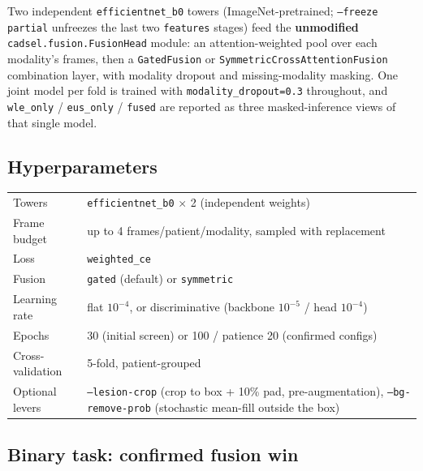 \documentclass[10pt]{article}
\begin{document}
\begin{sloppypar}
Two independent \texttt{efficientnet\_b0} towers (ImageNet-pretrained; \texttt{--freeze partial} unfreezes
the last two \texttt{features} stages) feed the \textbf{unmodified} \texttt{cadsel.fusion.FusionHead}
module: an attention-weighted pool over each modality's frames, then a \texttt{GatedFusion} or
\texttt{SymmetricCrossAttentionFusion} combination layer, with modality dropout and missing-modality
masking. One joint model per fold is
trained with \texttt{modality\_dropout=0.3} throughout, and \texttt{wle\_only} / \texttt{eus\_only} /
\texttt{fused} are reported as three masked-inference views of that single model.
\end{sloppypar}

\subsection{Hyperparameters}

\begin{center}
\begin{tabular}{lL{10cm}}
\toprule
Towers & \texttt{efficientnet\_b0} $\times$ 2 (independent weights) \\
Frame budget & up to 4 frames/patient/modality, sampled with replacement \\
Loss & \texttt{weighted\_ce} \\
Fusion & \texttt{gated} (default) or \texttt{symmetric} \\
Learning rate & flat $10^{-4}$, or discriminative (backbone $10^{-5}$ / head $10^{-4}$) \\
Epochs & 30 (initial screen) or 100 / patience 20 (confirmed configs) \\
Cross-validation & 5-fold, patient-grouped \\
Optional levers & \texttt{--lesion-crop} (crop to box + 10\% pad, pre-augmentation), \texttt{--bg-remove-prob} (stochastic mean-fill outside the box) \\
\bottomrule
\end{tabular}
\end{center}

\subsection{Binary task: confirmed fusion win}
\end{document}
